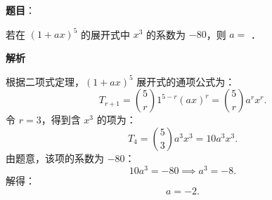 \begin{answer}

\textbf{题目}：

若在 $(1 + ax)^5$ 的展开式中 $x^3$ 的系数为 $-80$，则 $a =$ \gkblank{}．

\textbf{解析}

根据二项式定理，$(1 + ax)^5$ 展开式的通项公式为：
\nopagebreak[4]
\[
T_{r+1} = \binom{5}{r} 1^{5-r} (ax)^r = \binom{5}{r} a^r x^r.
\]
令 $r = 3$，得到含 $x^3$ 的项为：
\nopagebreak[4]
\[
T_4 = \binom{5}{3} a^3 x^3 = 10a^3 x^3.
\]
由题意，该项的系数为 $-80$：
\nopagebreak[4]
\[
10a^3 = -80 \implies a^3 = -8.
\]
解得：
\nopagebreak[4]
\[
a = -2.
\]


\end{answer}

